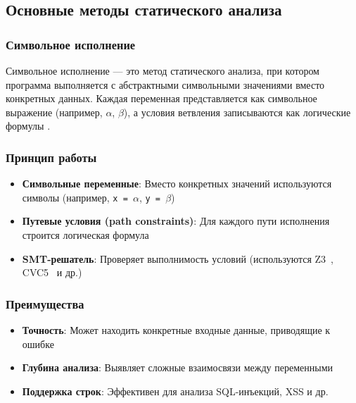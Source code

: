 \newpage




\subsection{Основные методы статического анализа}

\subsubsection{Символьное исполнение}
Символьное исполнение — это метод статического анализа, при котором программа выполняется с абстрактными символьными значениями вместо конкретных данных. Каждая переменная представляется как символьное выражение (например, $\alpha$, $\beta$), а условия ветвления записываются как логические формулы \cite{King76}.

\subsubsection{Принцип работы}
\begin{itemize}
    \item \textbf{Символьные переменные}: Вместо конкретных значений используются символы (например, \texttt{x = $\alpha$}, \texttt{y = $\beta$})
    \item \textbf{Путевые условия (path constraints)}: Для каждого пути исполнения строится логическая формула
    \item \textbf{SMT-решатель}: Проверяет выполнимость условий (используются Z3~\cite{Z3}, CVC5~\cite{CVC5} и др.)
\end{itemize}


\subsubsection{Преимущества}
\begin{itemize}
    \item \textbf{Точность}: Может находить конкретные входные данные, приводящие к ошибке
    \item \textbf{Глубина анализа}: Выявляет сложные взаимосвязи между переменными
    \item \textbf{Поддержка строк}: Эффективен для анализа SQL-инъекций, XSS и др.
\end{itemize}

